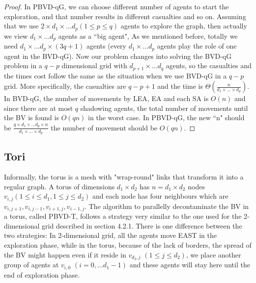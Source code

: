 \begin{proof}
In PBVD-qG, we can choose different number of agents to start the exploration, and that number results in different casualties and so on. Assuming that we use $2\times d_1\times \ldots d_p (1\leq p\leq q)$ agents to explore the graph, then actually we view $d_1\times \ldots d_p$ agents as a ``big agent", As we mentioned before, totally we need $d_1\times \ldots d_p\times (3q+1)$ agents (every $d_1\times\ldots d_p$ agents play the role of one agent in the BVD-qG). Now our problem changes into solving the BVD-qG problem in a $q-p$ dimensional grid with $d_{p+1}\times \ldots d_q$ agents, so the casualties and the times cost follow the same as the situation when we use BVD-qG in a $q-p$ grid. More specifically, the casualties are $q-p+1$ and the time is $\Theta(\frac{n}{d_1\times\ldots\times d_p})$. In BVD-qG, the number of movements by LEA, EA and each SA is $O(n)$ and since there are at most $q$ shadowing agents, the total number of movements until the BV is found is $O(qn)$ in the worst case. In PBVD-qG, the new ``n" should be $\frac{q\times d_1\times\ldots d_p\times n}{d_1\times\ldots\times d_p}$ the number of movement should be $O(qn)$.  
\end{proof}

\subsection{Tori}
Informally, the torus is a mesh with "wrap-round" links that transform it into a regular graph. A torus of dimensions $d_1\times d_2$ has $n=d_1\times d_2$ nodes $v_{i,j} (1\leq i\leq d_1, 1\leq j\leq d_2)$ and each node has four neighbours which are $v_{i,j+1}, v_{i,j-1}, v_{i+1,j}, v_{i-1,j}$. The algorithm to parallelly decontaminate the BV in a torus, called PBVD-T, follows a strategy very similar to the one used for the 2-dimensional grid described in section 4.2.1. There is one difference between the two strategies: In 2-dimensional grid, all the agents move EAST in the exploration phase, while in the torus, because of the lack of borders, the spread of the BV might happen even if it reside in $v_{d_2, j}$ $(1\leq j\leq d_2)$, we place another group of agents at $v_{i,0}$ $(i=0,\ldots d_1-1)$ and these agents will stay here until the end of exploration phase. 

